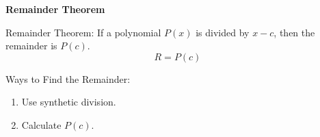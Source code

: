 \begin{center}
\textbf{Remainder Theorem 
}
\end{center}

\vspce 

Remainder Theorem: If a polynomial $P(x) $ is divided by $x-c$, then the remainder is $P(c)$. 
\[ R = P(c)\] 

\vspce 

Ways to Find the Remainder: 
\begin{enumerate}[label = \arabic*. ]
\item \hspce Use synthetic division. 
\item \hspce Calculate $P(c)$. 

\end{enumerate}  

